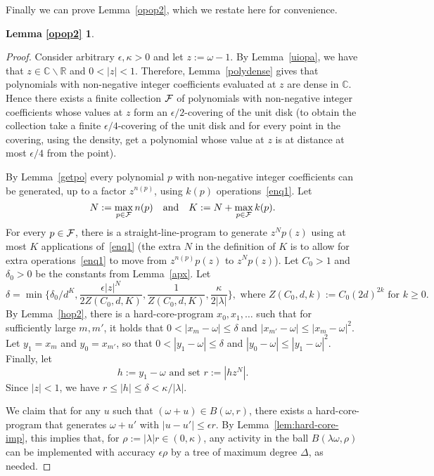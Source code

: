 \documentclass[11pt]{article}
\newtheorem*{lemopoptwo}{Lemma \ref{opop2}}
\def\Reals{\mathbb{R}}
\def\Complex{\mathbb{C}}
\newcommand{\eps}{\epsilon}
\begin{document}
Finally we can prove Lemma~\ref{opop2}, which we restate here for convenience.
\begin{lemopoptwo}
\statelemmaopoptwo
\end{lemopoptwo}
\begin{proof}
Consider arbitrary $\epsilon,\kappa>0$ and let $z:=\omega-1$. By Lemma~\ref{uiopa}, we have that $z\in \Complex\backslash \Reals$ and $0<|z|<1$. Therefore, Lemma~\ref{polydense} gives that polynomials with non-negative integer coefficients evaluated at $z$ are dense in $\Complex$. Hence there exists a finite collection ${\cal F}$ of polynomials with non-negative
integer coefficients whose values at $z$ form an $\eps/2$-covering of the unit disk (to obtain the collection
take a finite $\eps/4$-covering of the unit disk and for every point in the covering, using the density,
get a polynomial whose value at $z$ is at distance at most $\eps/4$ from the point).

By Lemma~\ref{getpo} every polynomial $p$  with non-negative integer coefficients can be generated, up to a factor  $z^{n(p)}$, using $k(p)$ operations~\eqref{enq1}. Let
$$
N:=\max_{p\in{\cal F}} n(p)\quad\mbox{and}\quad K:=N+\max_{p\in{\cal F}} k(p).
$$
For every $p\in{\cal F}$, there is a straight-line-program to generate $z^N p(z)$ using at most $K$ applications of~\eqref{enq1} (the extra $N$
in the definition of $K$ is to allow for extra operations~\eqref{enq1} to move from $z^{n(p)} p(z)$ to $z^N p(z)$).
Let $C_0>1$ and $\delta_0>0$ be the constants from Lemma~\ref{apx}. Let
\begin{equation}\label{dede}
\delta = \min\Big\{\delta_0 / d^K, \frac{\eps |z|^N}{2 Z(C_0,d,K)},\frac{1}{Z(C_0,d,K)},\frac{\kappa}{2|\lambda|} \Big\}, \mbox{ where $Z(C_0,d,k) := C_0 (2d)^{2k}$ for $k\geq 0$}.
\end{equation}
 By Lemma~\ref{hop2}, there is a hard-core-program $x_0,x_1,\hdots$ such that for sufficiently large $m,m'$, it holds that  $0<|x_m-\omega|\leq \delta$ and $|x_{m'}-\omega|\leq |x_m-\omega|^2$. Let $y_1=x_m$ and $y_0=x_{m'}$, so that $0<|y_1-\omega|\leq\delta$ and $|y_0-\omega|\leq |y_1-\omega|^2$. Finally, let 
\begin{equation*}
\mbox{$h:=y_1-\omega$ and set $r:=|hz^N|$.}
\end{equation*}
Since $|z|<1$, we have $r\leq |h|\leq \delta<\kappa/|\lambda|$.

We claim that for any $u$ such that $(\omega+u)\in B(\omega,r)$, there exists a hard-core-program that generates $\omega+u'$ with $|u-u'|\leq \epsilon r$. By Lemma~\ref{lem:hard-core-imp}, this implies that, for $\rho:=|\lambda| r\in(0,\kappa)$, any activity in the ball $B(\lambda \omega,\rho)$ can be implemented with accuracy $\epsilon \rho$ by a tree of maximum degree $\Delta$, as needed.


\end{proof}
\end{document}
